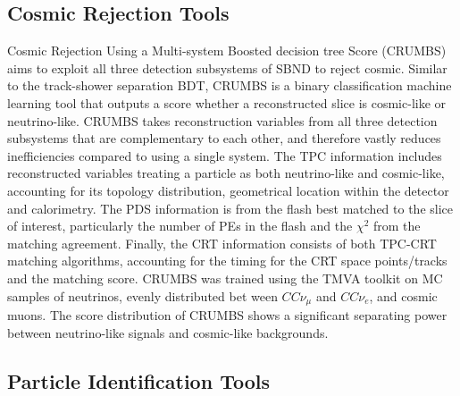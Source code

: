 \subsection{Cosmic Rejection Tools}
\label{sec:crumbs}

Cosmic Rejection Using a Multi-system Boosted decision tree Score (CRUMBS) \cite{crumbs} aims to exploit all three
 detection subsystems of SBND to reject cosmic.                                                         
Similar to the track-shower separation BDT, CRUMBS is a binary classification machine learning tool that outputs a score whether a reconstructed slice is cosmic-like or neutrino-like. 
CRUMBS takes reconstruction variables from all three detection subsystems that are complementary to each other, and therefore vastly reduces inefficiencies compared to using a single system.
The TPC information includes reconstructed variables treating a particle as both neutrino-like and cosmic-like, accounting for its topology distribution, geometrical location within the detector and calorimetry.                                                                                  
The PDS information is from the flash best matched to the slice of interest, particularly the number of PEs in the flash and the $\chi^{2}$  from the matching agreement.                        
Finally, the CRT information consists of both TPC-CRT matching algorithms, accounting for the timing for the CRT space points/tracks and the matching score.
CRUMBS was trained using the TMVA toolkit \cite{tmva} on MC samples of neutrinos, evenly distributed bet
ween $CC\nu_{\mu}$ and $CC\nu_{e}$, and cosmic muons.
The score distribution of CRUMBS shows a significant separating power between neutrino-like signals and cosmic-like backgrounds.

\subsection{Particle Identification Tools}
\label{sec:razzled}

